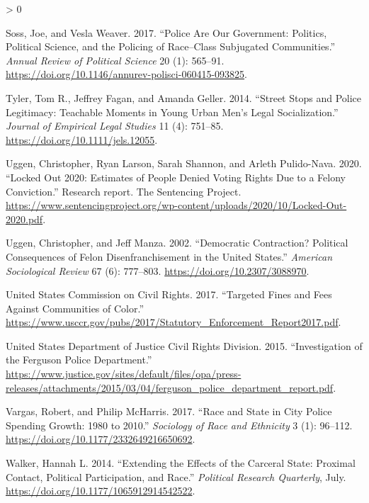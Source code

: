 \documentclass[
  12pt,
]{article}
\newlength{\cslhangindent}
\newenvironment{CSLReferences}[2] %
 {%
  \setlength{\parindent}{0pt}
  \ifodd #1 \everypar{\setlength{\hangindent}{\cslhangindent}}\ignorespaces\fi
  \ifnum #2 > 0
  \setlength{\parskip}{#2\baselineskip}
  \fi
 }%
 {}
\begin{document}
\begin{CSLReferences}{1}{0}
\leavevmode\hypertarget{ref-Soss2017}{}%
Soss, Joe, and Vesla Weaver. 2017. {``Police {Are Our Government}: {Politics}, {Political Science}, and the {Policing} of {Race}--{Class Subjugated Communities}.''} \emph{Annual Review of Political Science} 20 (1): 565--91. \url{https://doi.org/10.1146/annurev-polisci-060415-093825}.

\leavevmode\hypertarget{ref-Tyler2014}{}%
Tyler, Tom R., Jeffrey Fagan, and Amanda Geller. 2014. {``Street {Stops} and {Police Legitimacy}: {Teachable Moments} in {Young Urban Men}'s {Legal Socialization}.''} \emph{Journal of Empirical Legal Studies} 11 (4): 751--85. \url{https://doi.org/10.1111/jels.12055}.

\leavevmode\hypertarget{ref-Uggen2020}{}%
Uggen, Christopher, Ryan Larson, Sarah Shannon, and Arleth Pulido-Nava. 2020. {``Locked {Out} 2020: {Estimates} of {People Denied Voting Rights Due} to a {Felony Conviction}.''} Research report. {The Sentencing Project}. \url{https://www.sentencingproject.org/wp-content/uploads/2020/10/Locked-Out-2020.pdf}.

\leavevmode\hypertarget{ref-Uggen2002}{}%
Uggen, Christopher, and Jeff Manza. 2002. {``Democratic {Contraction}? {Political Consequences} of {Felon Disenfranchisement} in the {United States}.''} \emph{American Sociological Review} 67 (6): 777--803. \url{https://doi.org/10.2307/3088970}.

\leavevmode\hypertarget{ref-UnitedStatesCommissiononCivilRights2017}{}%
United States Commission on Civil Rights. 2017. {``Targeted {Fines} and {Fees Against Communities} of {Color}.''} \url{https://www.usccr.gov/pubs/2017/Statutory_Enforcement_Report2017.pdf}.

\leavevmode\hypertarget{ref-UnitedStatesDepartmentofJusticeCivilRightsDivision2015}{}%
United States Department of Justice Civil Rights Division. 2015. {``Investigation of the {Ferguson Police Department}.''} \url{https://www.justice.gov/sites/default/files/opa/press-releases/attachments/2015/03/04/ferguson_police_department_report.pdf}.

\leavevmode\hypertarget{ref-Vargas2017a}{}%
Vargas, Robert, and Philip McHarris. 2017. {``Race and {State} in {City Police Spending Growth}: 1980 to 2010.''} \emph{Sociology of Race and Ethnicity} 3 (1): 96--112. \url{https://doi.org/10.1177/2332649216650692}.

\leavevmode\hypertarget{ref-Walker2014}{}%
Walker, Hannah L. 2014. {``Extending the {Effects} of the {Carceral State}: {Proximal Contact}, {Political Participation}, and {Race}.''} \emph{Political Research Quarterly}, July. \url{https://doi.org/10.1177/1065912914542522}.


\end{CSLReferences}
\end{document}
